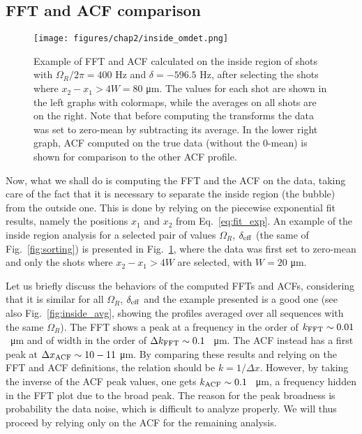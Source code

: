 \subsection{FFT and ACF comparison}
\begin{figure}[ht!]
    \centering
    \texttt{[image: figures/chap2/inside\_omdet.png]}
    \caption{Example of FFT and ACF calculated on the inside region of shots with $\Omega_R/2\pi = 400$ \unit{\hertz} and $\delta = -596.5$ \unit{\hertz}, after selecting the shots where $x_2-x_1 > 4W = 80$ \unit{\micro\meter}. The values for each shot are shown in the left graphs with colormaps, while the averages on all shots are on the right. Note that before computing the transforms the data was set to zero-mean by subtracting its average. In the lower right graph, ACF computed on the true data (without the 0-mean) is shown for comparison to the other ACF profile.}
    \label{fig:inside_00}
\end{figure}
Now, what we shall do is computing the FFT and the ACF on the data, taking care of the fact that it is necessary to separate the inside region (the bubble) from the outside one. This is done by relying on the piecewise exponential fit results, namely the positions $x_1$ and $x_2$ from Eq.\ \eqref{eq:fit_exp}.
An example of the inside region analysis for a selected pair of values $\Omega_R$, $\delta_{\rm eff}$ (the same of Fig.\ \ref{fig:sorting}) is presented in Fig.\ \ref{fig:inside_00}, where the data was first set to zero-mean and only the shots where $x_2-x_1 > 4W$ are selected, with $W = 20$ \unit{\micro\meter}.

Let us briefly discuss the behaviors of the computed FFTs and ACFs, considering that it is similar for all $\Omega_R$, $\delta_{\rm eff}$ and the example presented is a good one (see also Fig.\ \ref{fig:inside_avg}, showing the profiles averaged over all sequences with the same $\Omega_R$). The FFT shows a peak at a frequency in the order of $k_{\rm FFT} \sim 0.01$ \unit{\per\micro\meter} and of width in the order of $\Delta k_{\rm FFT} \sim 0.1$ \unit{\per\micro\meter}. The ACF instead has a first peak at $\Delta x_{\rm ACF} \sim 10-11$ \unit{\micro\meter}. By comparing these results and relying on the FFT and ACF definitions, the relation should be $k = 1/\Delta x$. However, by taking the inverse of the ACF peak values, one gets $k_{\rm ACF} \sim 0.1$ \unit{\per\micro\meter}, a frequency hidden in the FFT plot due to the broad peak. The reason for the peak broadness is probability the data noise, which is difficult to analyze properly. We will thus proceed by relying only on the ACF for the remaining analysis.

